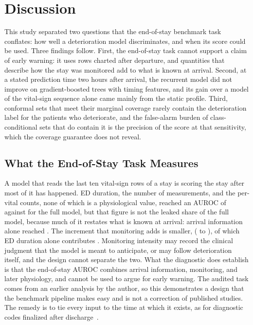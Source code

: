 \section{Discussion}
\label{sec:discussion}

This study separated two questions that the end-of-stay benchmark task conflates: how well a deterioration model discriminates, and when its score could be used.
Three findings follow. First, the end-of-stay task cannot support a claim of early warning: it uses rows charted after departure, and quantities that describe how the stay was monitored add to what is
known at arrival. Second, at a stated prediction time two hours after arrival, the recurrent model did not improve on gradient-boosted trees with timing features, and its
gain over a model of the vital-sign sequence alone came mainly from the static profile. Third, conformal sets that meet their marginal coverage rarely contain the
deterioration label for the patients who deteriorate, and the false-alarm burden of class-conditional sets that do contain it is the precision of the score at that sensitivity, which the coverage guarantee does not reveal.

\subsection{What the End-of-Stay Task Measures}

A model that reads the last ten vital-sign rows of a stay is scoring the stay after most of it has happened. ED
duration, the number of measurements, and the per-vital counts, none of which is a physiological value, reached an AUROC of \RVShortAAuroc{} against
\RVEosHybridAuroc{} for the full model, but that figure is not the leaked share of the full model, because much of it restates what is known at arrival: arrival information alone reached \RVIncArr{}. The increment that monitoring adds is smaller, \RVIncWorkOverArr{} (\RVIncWorkOverArrLo{} to \RVIncWorkOverArrHi{}), of which ED duration alone contributes \RVIncDurOverArr{}. Monitoring intensity may record the clinical judgment that the model is meant to anticipate, or may follow deterioration itself, and the design cannot separate the two. What the diagnostic does
establish is that the end-of-stay AUROC combines arrival information, monitoring, and later physiology, and cannot be used to argue for early warning. The audited task comes from an earlier analysis by the author, so this demonstrates a design that the benchmark pipeline makes easy and is not a correction of published studies. The remedy is to tie every input to the time at which it exists, as for diagnostic codes finalized after discharge~\cite{ramadan2025icdleakage}.

